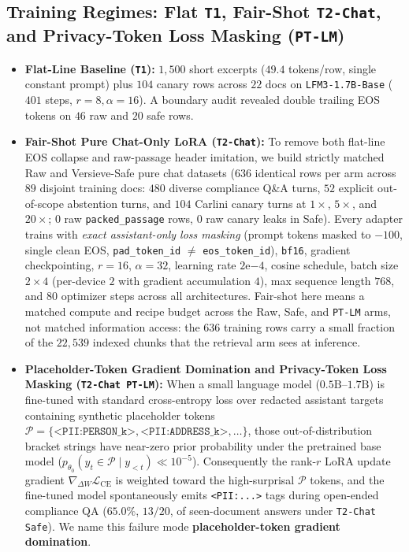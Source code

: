 \documentclass{article}
\begin{document}
\subsection{Training Regimes: Flat \texttt{T1}, Fair-Shot \texttt{T2-Chat}, and Privacy-Token Loss Masking (\texttt{PT-LM})}
\begin{itemize}
    \item \textbf{Flat-Line Baseline (\texttt{T1}):} $1{,}500$ short excerpts ($49.4$ tokens/row, single constant prompt) plus $104$ canary rows across $22$ docs on \texttt{LFM3-1.7B-Base} ($401$ steps, $r=8, \alpha=16$). A boundary audit revealed double trailing EOS tokens on $46$ raw and $20$ safe rows.
    \item \textbf{Fair-Shot Pure Chat-Only LoRA (\texttt{T2-Chat}):} To remove both flat-line EOS collapse and raw-passage header imitation, we build strictly matched Raw and Versieve-Safe pure chat datasets ($636$ identical rows per arm across $89$ disjoint training docs: $480$ diverse compliance Q\&A turns, $52$ explicit out-of-scope abstention turns, and $104$ Carlini canary turns at $1\times$, $5\times$, and $20\times$; $0$ raw \texttt{packed\_passage} rows, $0$ raw canary leaks in Safe). Every adapter trains with \emph{exact assistant-only loss masking} (prompt tokens masked to $-100$, single clean EOS, \texttt{pad\_token\_id} $\neq$ \texttt{eos\_token\_id}), \texttt{bf16}, gradient checkpointing, $r=16$, $\alpha=32$, learning rate $2\mathrm{e}{-4}$, cosine schedule, batch size $2{\times}4$ (per-device $2$ with gradient accumulation $4$), max sequence length $768$, and $80$ optimizer steps across all architectures. Fair-shot here means a matched compute and recipe budget across the Raw, Safe, and \texttt{PT-LM} arms, not matched information access: the $636$ training rows carry a small fraction of the $22{,}539$ indexed chunks that the retrieval arm sees at inference.
    \item \textbf{Placeholder-Token Gradient Domination and Privacy-Token Loss Masking (\texttt{T2-Chat PT-LM}):} When a small language model ($0.5\text{B}$--$1.7\text{B}$) is fine-tuned with standard cross-entropy loss over redacted assistant targets containing synthetic placeholder tokens $\mathcal{P} = \{\texttt{<PII:PERSON\_k>}, \texttt{<PII:ADDRESS\_k>}, \dots\}$, those out-of-distribution bracket strings have near-zero prior probability under the pretrained base model ($p_{\theta_0}(y_t \in \mathcal{P} \mid y_{<t}) \ll 10^{-5}$). Consequently the rank-$r$ LoRA update gradient $\nabla_{\Delta W}\mathcal{L}_{\text{CE}}$ is weighted toward the high-surprisal $\mathcal{P}$ tokens, and the fine-tuned model spontaneously emits \texttt{<PII:...>} tags during open-ended compliance QA ($65.0\%$, $13/20$, of seen-document answers under \texttt{T2-Chat Safe}). We name this failure mode \textbf{placeholder-token gradient domination}.

\end{itemize}
\end{document}
